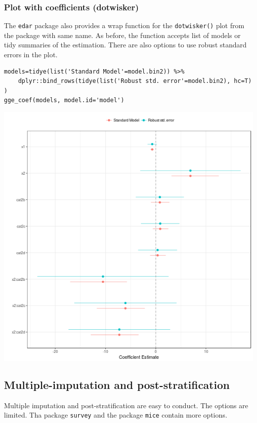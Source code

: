 \documentclass[a4paper]{article}
\begin{document}
\subsubsection{Plot with coefficients (dotwisker)}
\label{sec:orge294469}
The \texttt{edar} package also provides a wrap function for the \texttt{dotwisker()} plot from the package with same name. As before, the function accepts list of models or tidy summaries of the estimation. There are also options to use robust standard errors in the plot.

\lstset{numbers=left,language=r,label= ,caption= ,captionpos=b}
\begin{lstlisting}
models=tidye(list('Standard Model'=model.bin2)) %>%
    dplyr::bind_rows(tidye(list('Robust std. error'=model.bin2), hc=T) )
gge_coef(models, model.id='model')
\end{lstlisting}

\begin{center}
\includegraphics[width=.9\linewidth]{dotwisker-1.png}
\end{center}
\subsection{Multiple-imputation and post-stratification}
\label{sec:org5b98d58}
Multiple imputation and post-stratification are easy to conduct. The options are limited. Tha package \texttt{survey} and the package \texttt{mice} contain more options.
\end{document}
